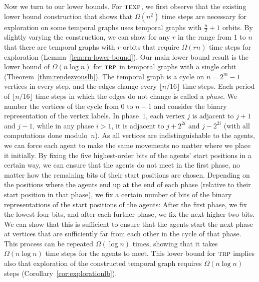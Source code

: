 \documentclass[10pt,a4paper]{article}
\newcommand{\trp}{\textsc{trp}}
\newcommand{\texp}{\textsc{texp}}
\begin{document}
Now we turn to our lower bounds.
For $\texp$, we first observe that the
existing lower bound construction that shows that $\Omega(n^2)$ time steps are
necessary for exploration on some temporal graphs uses temporal graphs with
$\frac{n}{2}+1$ orbits. By slightly varying the construction, we can show
for any $r$ in the range from $1$ to $n$
that there are temporal graphs with $r$ orbits that require
$\Omega(rn)$ time steps for exploration (Lemma~\ref{lem:rn-lower-bound}).
Our main lower bound result is the lower bound of
$\Omega(n\log n)$ for $\trp$ in temporal graphs with a single orbit
(Theorem~\ref{thm:rendezvouslb}). The
temporal graph is a cycle {on $n=2^m-1$ vertices} in every step, and the
edges change every $\lfloor n/16\rfloor$ time steps. Each period of $\lfloor
n/16\rfloor$ time steps in which the edges do not change is called a
\emph{phase}. We number the vertices of the cycle from $0$ to $n-1$ and consider
the binary representation of the vertex labels. {In phase~$1$, each vertex
$j$ is adjacent to $j+1$ and $j-1$, while in any phase $i>1$, it is adjacent to
$j+2^{2i}$ and $j-2^{2i}$ (with all computations done modulo~$n$).} As all
vertices are indistinguishable to the agents, we can force each agent to make
the same movements no matter where we place it initially. By fixing the five
highest-order bits of the agents' start positions in a certain way, we can
ensure that the agents do not meet in the first phase, no matter how the
remaining bits of their start positions are chosen. Depending on the positions
where the agents end up at the end of each phase (relative to their start
position in that phase), {we fix a certain number of bits of the binary
representations of the start positions of the agents: After the first phase, we
fix the lowest four bits, and after each further phase, we fix the next-higher
two bits. We can show that this is sufficient to ensure} that the agents start
the next phase at vertices that are sufficiently far from each other in the
cycle of that phase. This process can be repeated $\Omega(\log n)$ times,
showing that it takes $\Omega(n \log n)$ {time steps} for the agents to meet. This lower
bound for $\trp$ implies also that exploration of the constructed temporal graph
requires $\Omega(n \log n)$ steps (Corollary~\ref{cor:explorationlb}).

\end{document}
